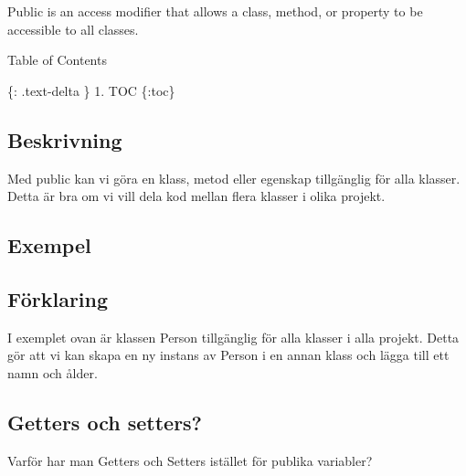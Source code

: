 Public is an access modifier that allows a class, method, or property to
be accessible to all classes.

Table of Contents

\{: .text-delta \} 1. TOC \{:toc\}

\hypertarget{beskrivning}{%
\subsection{Beskrivning}\label{beskrivning}}

Med public kan vi göra en klass, metod eller egenskap tillgänglig för
alla klasser. Detta är bra om vi vill dela kod mellan flera klasser i
olika projekt.

\hypertarget{exempel}{%
\subsection{Exempel}\label{exempel}}

\hypertarget{cb1}{}
\begin{Shaded}
\begin{Highlighting}[]
 \OperatorTok{\{}
     \OperatorTok{;}
     \OperatorTok{;}
\OperatorTok{\}}
\end{Highlighting}
\end{Shaded}

\hypertarget{fuxf6rklaring}{%
\subsection{Förklaring}\label{fuxf6rklaring}}

I exemplet ovan är klassen Person tillgänglig för alla klasser i alla
projekt. Detta gör att vi kan skapa en ny instans av Person i en annan
klass och lägga till ett namn och ålder.

\hypertarget{getters-och-setters}{%
\subsection{Getters och setters?}\label{getters-och-setters}}

Varför har man Getters och Setters istället för publika variabler?


